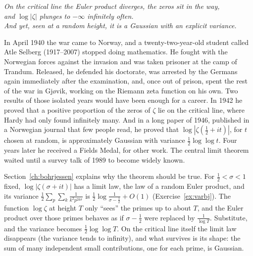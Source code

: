\begin{center}\itshape
On the critical line the Euler product diverges, the zeros sit in the way,\\
and $\log|\zeta|$ plunges to $-\infty$ infinitely often.\\
And yet, seen at a random height, it is a Gaussian with an explicit variance.
\end{center}

In April 1940 the war came to Norway, and a twenty-two-year-old student called Atle Selberg (1917--2007) stopped doing mathematics. He fought with the Norwegian forces against the invasion and was taken prisoner at the camp of Trandum. Released, he defended his doctorate, was arrested by the Germans again immediately after the examination, and, once out of prison, spent the rest of the war in Gj\o{}vik, working on the Riemann zeta function on his own. Two results of those isolated years would have been enough for a career. In 1942 he proved that a positive proportion of the zeros of $\zeta$ lie on the critical line, where Hardy had only found infinitely many. And in a long paper of 1946, published in a Norwegian journal that few people read, he proved that $\log|\zeta(\frac12+it)|$, for $t$ chosen at random, is approximately Gaussian with variance $\frac12\log\log t$. Four years later he received a Fields Medal, for other work. The central limit theorem waited until a survey talk of 1989 to become widely known.

Section~\ref{ch:bohrjessen} explains why the theorem should be true. For $\frac12<\sigma<1$ fixed, $\log|\zeta(\sigma+it)|$ has a limit law, the law of a random Euler product, and its variance $\frac12\sum_p\sum_k\frac1{k^2p^{2k\sigma}}$ is $\frac12\log\frac1{\sigma-\frac12}+O(1)$ (Exercise~\ref{ex:varbj}). The function $\log\zeta$ at height $T$ only ``sees'' the primes up to about $T$, and the Euler product over those primes behaves as if $\sigma-\frac12$ were replaced by $\frac1{\log T}$. Substitute, and the variance becomes $\frac12\log\log T$. On the critical line itself the limit law disappears (the variance tends to infinity), and what survives is its shape: the sum of many independent small contributions, one for each prime, is Gaussian.

